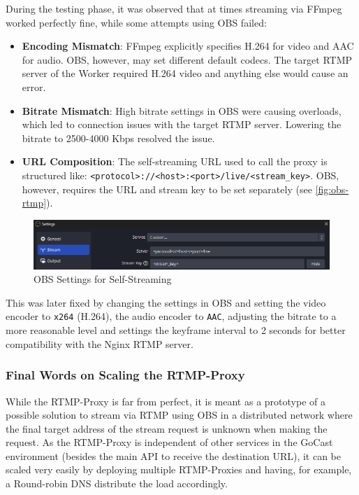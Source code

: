 During the testing phase, it was observed that at times streaming via FFmpeg worked perfectly fine, while some attempts using OBS failed:
\begin{itemize}
    \item \textbf{Encoding Mismatch}: FFmpeg explicitly specifies H.264 for video and AAC for audio. OBS, however, may set different default codecs. The target \ac{RTMP} server of the Worker required H.264 video and anything else would cause an error.
    \item \textbf{Bitrate Mismatch}: High bitrate settings in OBS were causing overloads, which led to connection issues with the target \ac{RTMP} server. Lowering the bitrate to 2500-4000 Kbps resolved the issue.
    \item \textbf{URL Composition}: The self-streaming URL used to call the proxy is structured like: \texttt{<protocol>://<host>:<port>/live/<stream\_key>}. OBS, however, requires the URL and stream key to be set separately (see \autoref{fig:obs-rtmp}).
\end{itemize}

\begin{figure}[htpb]
    \centering
    \includegraphics[width=\linewidth]{images/OBSRTMP.png}
    \caption[OBS Settings for Self-Streaming]{OBS Settings for Self-Streaming}\label{fig:obs-rtmp}
\end{figure}

This was later fixed by changing the settings in OBS and setting the video encoder to \texttt{x264} (H.264), the audio encoder to \texttt{AAC}, adjusting the bitrate to a more reasonable level and settings the keyframe interval to 2 seconds for better compatibility with the Nginx \ac{RTMP} server.

\subsubsection{Final Words on Scaling the RTMP-Proxy}

While the RTMP-Proxy is far from perfect, it is meant as a prototype of a possible solution to stream via \ac{RTMP} using OBS in a distributed network where the final target address of the stream request is unknown when making the request. As the RTMP-Proxy is independent of other services in the GoCast environment (besides the main \ac{API} to receive the destination URL), it can be scaled very easily by deploying multiple RTMP-Proxies and having, for example, a Round-robin DNS distribute the load accordingly.

